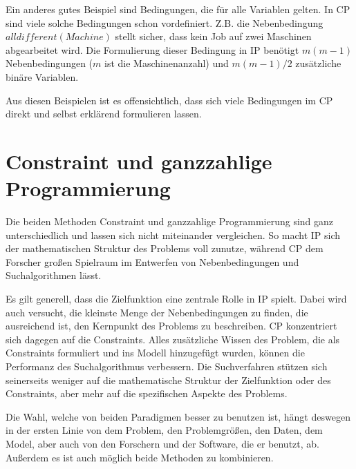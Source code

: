 Ein anderes gutes Beispiel sind Bedingungen, die für alle Variablen gelten. In CP sind viele solche Bedingungen schon vordefiniert. Z.B. die Nebenbedingung $alldifferent(Machine)$ stellt sicher, dass kein Job auf zwei Maschinen abgearbeitet wird. Die Formulierung dieser Bedingung in IP benötigt $m(m-1)$ Nebenbedingungen ($m$ ist die Maschinenanzahl) und $m(m-1)/2$ zusätzliche binäre Variablen.

Aus diesen Beispielen ist es offensichtlich, dass sich viele Bedingungen im CP direkt und selbst erklärend formulieren lassen.

\section{Constraint und ganzzahlige Programmierung}

Die beiden Methoden Constraint und  ganzzahlige Programmierung sind ganz unterschiedlich und lassen sich nicht miteinander vergleichen. 
So macht IP sich der mathematischen Struktur des Problems voll zunutze, während CP dem Forscher großen Spielraum im Entwerfen von Nebenbedingungen und Suchalgorithmen lässt.

Es gilt generell, dass die Zielfunktion eine zentrale Rolle in IP spielt. Dabei wird auch versucht, die kleinste Menge der Nebenbedingungen zu finden, die ausreichend ist, den Kernpunkt des Problems zu beschreiben. CP konzentriert sich dagegen auf die Constraints. Alles zusätzliche Wissen des Problem, die als Constraints formuliert und ins Modell hinzugefügt wurden, können die Performanz des Suchalgorithmus verbessern. Die Suchverfahren stützen sich seinerseits weniger auf die mathematische Struktur der Zielfunktion oder des Constraints, aber mehr auf die spezifischen Aspekte des Problems.

Die Wahl, welche von beiden Paradigmen besser zu benutzen ist, hängt deswegen in der ersten Linie von dem Problem, den Problemgrößen, den Daten, dem Model, aber auch von den Forschern und der Software, die er benutzt, ab. Außerdem es ist auch möglich beide Methoden zu kombinieren.



